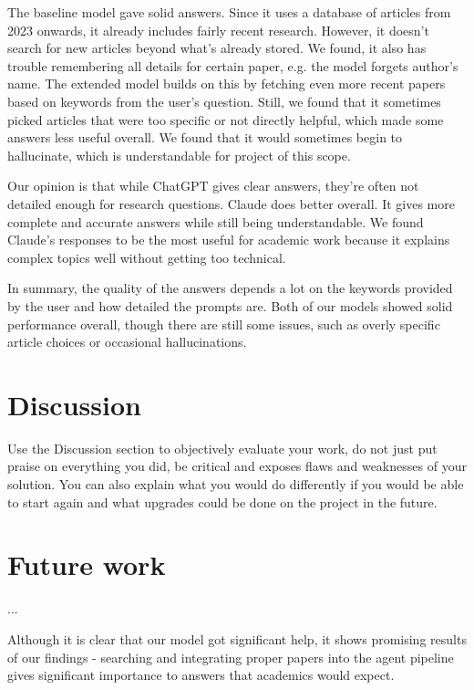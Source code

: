 \documentclass[fleqn,moreauthors,10pt]{ds_report}
\begin{document}
The baseline model gave solid answers. Since it uses a  database of articles from 2023 onwards, it already includes fairly recent research. However, it doesn’t search for new articles beyond what’s already stored. We found, it also has trouble remembering all details for certain paper, e.g. the model forgets author's name. The extended model builds on this by fetching even more recent papers based on keywords from the user's question. Still, we found that it sometimes picked articles that were too specific or not directly helpful, which made some answers less useful overall. We found that it would sometimes begin to hallucinate, which is understandable for project of this scope.

Our opinion is that while ChatGPT gives clear answers, they're often not detailed enough for research questions. Claude does better overall. It gives more complete and accurate answers while still being understandable. We found Claude's responses to be the most useful for academic work because it explains complex topics well without getting too technical.

In summary, the quality of the answers depends a lot on the keywords provided by the user and how detailed the prompts are. Both of our models showed solid performance overall, though there are still some issues, such as overly specific article choices or occasional hallucinations. 



\section*{Discussion}

Use the Discussion section to objectively evaluate your work, do not just put praise on everything you did, be critical and exposes flaws and weaknesses of your solution. You can also explain what you would do differently if you would be able to start again and what upgrades could be done on the project in the future.

\section*{Future work}

...

Although it is clear that our model got significant help, it shows promising results of our findings - searching and integrating proper papers into the agent pipeline gives significant importance to answers that academics would expect.
\end{document}
